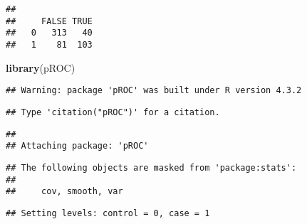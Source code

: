 \documentclass[
]{article}
\newenvironment{Shaded}{\begin{snugshade}}{\end{snugshade}}
\newcommand{\AttributeTok}[1]{\textcolor[rgb]{0.13,0.29,0.53}{#1}}
\newcommand{\CommentTok}[1]{\textcolor[rgb]{0.56,0.35,0.01}{\textit{#1}}}
\newcommand{\FunctionTok}[1]{\textcolor[rgb]{0.13,0.29,0.53}{\textbf{#1}}}
\newcommand{\NormalTok}[1]{#1}
\newcommand{\OtherTok}[1]{\textcolor[rgb]{0.56,0.35,0.01}{#1}}
\newcommand{\SpecialCharTok}[1]{\textcolor[rgb]{0.81,0.36,0.00}{\textbf{#1}}}
\newcommand{\StringTok}[1]{\textcolor[rgb]{0.31,0.60,0.02}{#1}}
\begin{document}
\begin{verbatim}
##    
##     FALSE TRUE
##   0   313   40
##   1    81  103
\end{verbatim}

\begin{Shaded}
\begin{Highlighting}[]
\FunctionTok{library}\NormalTok{(pROC)}
\end{Highlighting}
\end{Shaded}

\begin{verbatim}
## Warning: package 'pROC' was built under R version 4.3.2
\end{verbatim}

\begin{verbatim}
## Type 'citation("pROC")' for a citation.
\end{verbatim}

\begin{verbatim}
## 
## Attaching package: 'pROC'
\end{verbatim}

\begin{verbatim}
## The following objects are masked from 'package:stats':
## 
##     cov, smooth, var
\end{verbatim}

\begin{Shaded}
\end{Shaded}

\begin{verbatim}
## Setting levels: control = 0, case = 1
\end{verbatim}
\end{document}
